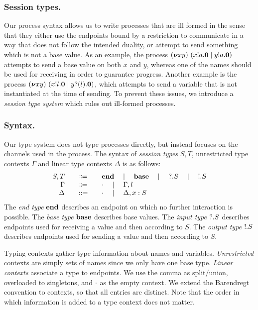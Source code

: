 \subsubsection{Session types.}
Our process syntax allows us to write processes that are ill formed in
the sense that they either use the endpoints bound by a restriction to
communicate in a way that does not follow the intended duality, or
attempt to send something which is not a base value.  As an example,
the process
\( (\bm{\nu} xy)~(x ! a . \bm{0} \mid y ! a . \bm{0}) \)
attempts to send a base value on both \( x \) and \( y\), whereas one
of the names should be used for receiving in order to guarantee
progress.  Another example is the process
\( (\bm{\nu} xy)~(x ! l . \bm{0} \mid y ? (l) . \bm{0}) \),
which attempts to send a variable that is not instantiated at the time
of sending.
%
To prevent these issues, we introduce a \emph{session type system} which
rules out ill-formed processes.

\subsubsection{Syntax.}
Our type system does not type processes directly, but instead focuses on the channels used in the process.
The syntax of \emph{session types} \( S, T \), unrestricted type contexts \( \Gamma \) and linear type contexts \( \Delta \) is as follows:
\[
  \begin{array}{r@{\qquad}c@{\qquad}l}
  S,T & \Coloneqq & \Tend \quad\mid\quad \Tbase \quad\mid\quad \Tin{S} \quad\mid\quad \Tout{S} \\
    \Gamma & \Coloneqq & \Cempty \quad\mid\quad \Gamma, l \\
                    \Delta &::= & \Cempty \quad\mid\quad \Cadd{\Delta}{\hastype{x}{S}}
  \end{array}
\]
The \emph{end type} \( \mathbf{end} \) describes an endpoint on which no further interaction is possible.
The \emph{base type} \( \mathbf{base} \) describes base values.
The \emph{input type} \( {?}.S \) describes endpoints used for receiving a value and then according to \( S \).
The \emph{output type} \( {!}.S \) describes endpoints used for sending a value and then according to \( S \).

Typing contexts gather type information about names and variables.
\emph{Unrestricted} contexts are simply sets of names since we only have one
base type. \emph{Linear contexts} associate a type to endpoints. We use
the comma as split/union, overloaded to singletons, and \( \cdot \) as the
empty context. We extend the Barendregt convention to contexts, so that all
entries are distinct.  Note that the order in which information is added to a
type context does not matter.

